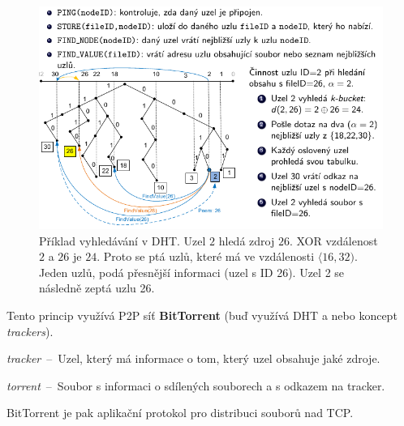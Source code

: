 \begin{figure}[htb!]
    \centering
    \includegraphics[width=1\linewidth]{dht_3.pdf}
    \caption{Příklad vyhledávání v DHT. Uzel $2$ hledá zdroj $26$. XOR vzdálenost $2$ a $26$ je $24$. Proto se ptá uzlů, které má ve vzdálenosti $\langle 16,32 )$. Jeden uzlů, podá přesnější informaci (uzel s ID 26). Uzel 2 se následně zeptá uzlu 26.}
\end{figure}

\begin{compactitem}
    \item Tento princip využívá P2P síť \textbf{BitTorrent} (buď využívá DHT a nebo koncept \textit{trackers}). \begin{compactitem}
        \item \textit{tracker}~--~Uzel, který má informace o tom, který uzel obsahuje jaké zdroje.
        \item \textit{torrent}~--~Soubor s informaci o sdílených souborech a s odkazem na tracker.
        \item BitTorrent je pak aplikační protokol pro distribuci souborů nad TCP.
    \end{compactitem}
\end{compactitem}
